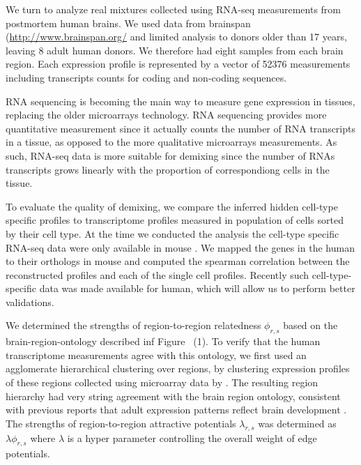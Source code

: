
We turn to analyze real mixtures collected using RNA-seq measurements from postmortem human brains. We used data from brainspan \cite{brainspan} (\url{http://www.brainspan.org/} and limited analysis to donors older than 17 years, leaving 8 adult human donors. We therefore had eight samples from each brain region. Each expression profile is represented by a vector of 52376 measurements including transcripts counts for coding and non-coding sequences. 


RNA sequencing is becoming the main way to measure gene expression in tissues, replacing the older microarrays technology. RNA sequencing provides more quantitative measurement since it actually counts the number of RNA transcripts in a tissue, as opposed to the more qualitative microarrays measurements. As such, RNA-seq data is more suitable for demixing since the number of RNAs transcripts grows linearly with the proportion of correspondiong cells in the tissue.

To evaluate the quality of demixing, we compare the inferred hidden cell-type specific profiles to transcriptome profiles measured in population of cells sorted by their cell type. At the time we conducted the analysis the cell-type specific RNA-seq data were only available in mouse \cite{barres2014}. We mapped the genes in the human to their orthologs in mouse and computed the spearman correlation between the reconstructed profiles and each of the single cell profiles. Recently such cell-type-specific data was made available for human, which will allow us to perform better validations. 

We determined the strengths of region-to-region relatedness $\phi_{r,s}$ based on the brain-region-ontology described inf Figure ~(1). To verify that the human transcriptome measurements agree with this ontology, we first used an agglomerate hierarchical clustering over regions, by clustering expression profiles of these regions collected using microarray data by \cite{kang}. The resulting region hierarchy had very string agreement with the brain region ontology, consistent with previous reports that adult expression patterns reflect brain development \cite{zapala-2005}. The strengths of region-to-region attractive potentials $\lambda_{r,s}$ was determined as $\lambda \phi_{r,s}$ where $\lambda$ is a hyper parameter controlling the overall weight of edge potentials. 


